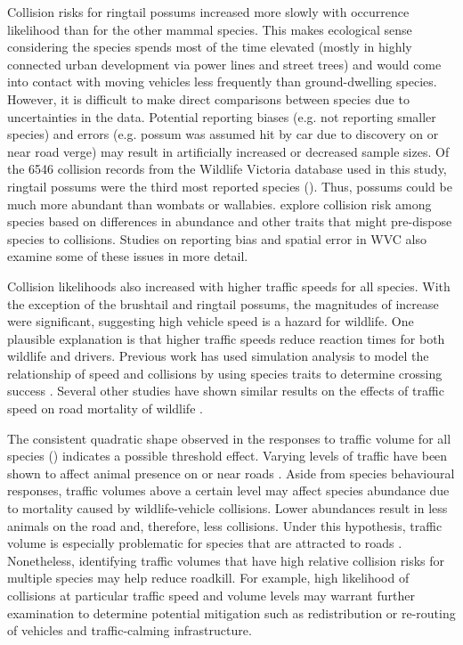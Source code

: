 Collision risks for ringtail possums increased more slowly with occurrence likelihood than for the other mammal species.  This makes ecological sense considering the species spends most of the time elevated (mostly in highly connected urban development via power lines and street trees) and would come into contact with moving vehicles less frequently than ground-dwelling species.  However, it is difficult to make direct comparisons between species due to uncertainties in the data.  Potential reporting biases (e.g. not reporting smaller species) and errors (e.g. possum was assumed hit by car due to discovery on or near road verge) may result in artificially increased or decreased sample sizes. Of the 6546 collision records from the Wildlife Victoria database used in this study, ringtail possums were the third most reported species ().  Thus, possums could be much more abundant than wombats or wallabies. \cite{gril14} explore collision risk among species based on differences in abundance and other traits that might pre-dispose species to collisions. Studies on reporting bias \citep{snow15} and spatial error \citep{guns09} in WVC also examine some of these issues in more detail.

Collision likelihoods also increased with higher traffic speeds for all species.  With the exception of the brushtail and ringtail possums, the magnitudes of increase were significant, suggesting high vehicle speed is a hazard for wildlife.  One plausible explanation is that higher traffic speeds reduce reaction times for both wildlife and drivers. Previous work has used simulation analysis to model the relationship of speed and collisions by using species traits to determine crossing success \citep{jaar06}. Several other studies have shown similar results on the effects of traffic speed on road mortality of wildlife \citep[e.g.][]{farm12,gkri13,lao11,ramp06a,seil05,seil06,sudh09,vanl09}.

The consistent quadratic shape observed in the responses to traffic volume for all species () indicates a possible threshold effect.  Varying levels of traffic have been shown to affect animal presence on or near roads \citep{jaeg05,rhod14}. Aside from species behavioural responses, traffic volumes above a certain level may affect species abundance due to mortality caused by wildlife-vehicle collisions. Lower abundances result in less animals on the road and, therefore, less collisions. Under this hypothesis, traffic volume is especially problematic for species that are attracted to roads \citep{form03}. Nonetheless, identifying traffic volumes that have high relative collision risks for multiple species may help reduce roadkill.  For example, high likelihood of collisions at particular traffic speed and volume levels may warrant further examination to determine potential mitigation such as redistribution or re-routing of vehicles and traffic-calming infrastructure.

